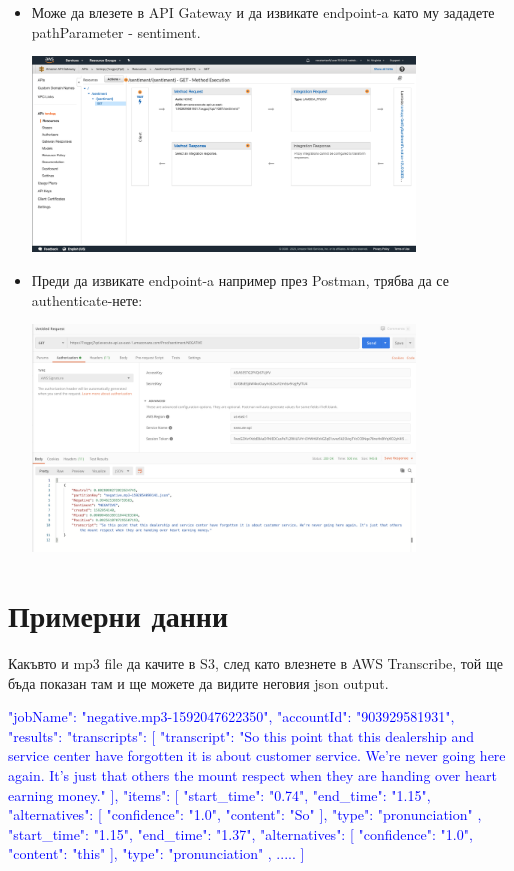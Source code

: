 \documentclass[12pt]{article}
\begin{document}
\begin{itemize}
\item Може да влезете в API Gateway и да извикате endpoint-a като му зададете pathParameter - sentiment.

 \includegraphics[width=0.8\textwidth]{check_api_gateway.png}
 
\item Преди да извикате endpoint-a например през Postman, трябва да се authenticate-нете: 

 \includegraphics[width=0.8\textwidth]{postman_authenticate.png}
 
\end{itemize}

\section{Примерни данни}

Какъвто и mp3 file да качите в S3, след като влезнете в AWS Transcribe, той ще бъда показан там и ще можете да видите неговия json output.

\textcolor{blue}{
  "jobName": "negative.mp3-1592047622350",
  "accountId": "903929581931",
  "results": {
    "transcripts": [
      {
        "transcript": "So this point that this dealership and service center have forgotten it is about customer service. We're never going here again. It's just that others the mount respect when they are handing over heart earning money."
      }
    ],
    "items": [
      {
        "start_time": "0.74",
        "end_time": "1.15",
        "alternatives": [{ "confidence": "1.0", "content": "So" }],
        "type": "pronunciation"
      },
      {
        "start_time": "1.15",
        "end_time": "1.37",
        "alternatives": [{ "confidence": "1.0", "content": "this" }],
        "type": "pronunciation"
      },
      .....
      ]}}
\end{document}
